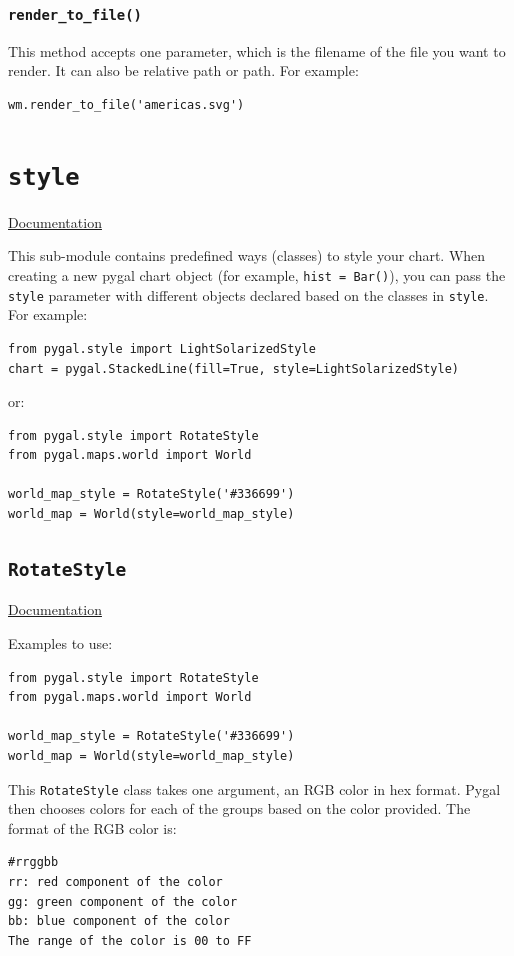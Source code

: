 \documentclass[12pt]{book}
\begin{document}
\subsubsection{\texttt{render\_to\_file()}}
\label{sec:org8554233}
This method accepts one parameter, which is the filename of the file you want to render. It can also be relative path or path. For example:
\begin{verbatim}
wm.render_to_file('americas.svg')
\end{verbatim}

\section{\texttt{style}}
\label{sec:orgf23fb0f}
\href{http://www.pygal.org/en/stable/documentation/styles.html}{Documentation}

This sub-module contains predefined ways (classes) to style your chart. When creating a new pygal chart object (for example, \texttt{hist = Bar()}), you can pass the \texttt{style} parameter with different objects declared based on the classes in \texttt{style}. For example:
\begin{verbatim}
from pygal.style import LightSolarizedStyle
chart = pygal.StackedLine(fill=True, style=LightSolarizedStyle)
\end{verbatim}
or:
\begin{verbatim}
from pygal.style import RotateStyle
from pygal.maps.world import World

world_map_style = RotateStyle('#336699')
world_map = World(style=world_map_style)
\end{verbatim}
\subsection{\texttt{RotateStyle}}
\label{sec:org4091aa5}
\href{http://www.pygal.org/en/stable/documentation/parametric\_styles.html\#rotate}{Documentation}

Examples to use:
\begin{verbatim}
from pygal.style import RotateStyle
from pygal.maps.world import World

world_map_style = RotateStyle('#336699')
world_map = World(style=world_map_style)
\end{verbatim}
This \texttt{RotateStyle} class takes one argument, an RGB color in hex format. Pygal then chooses colors for each of the groups based on the color provided. The format of the RGB color is:
\begin{verbatim}
#rrggbb
rr: red component of the color
gg: green component of the color
bb: blue component of the color
The range of the color is 00 to FF
\end{verbatim}
\end{document}
